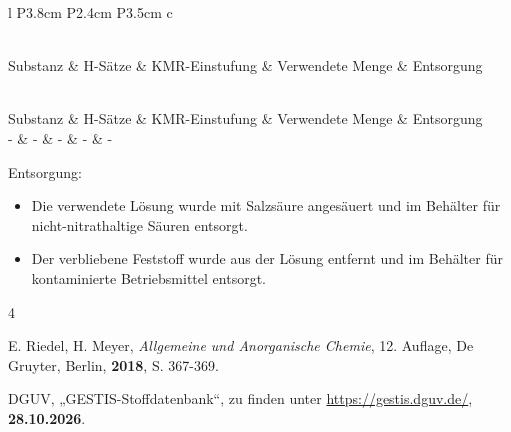 \documentclass[
	a4paper,										%
	12pt,											%
	twoside,										%
	headsepline,								%
	footsepline,									%
	captions=tableheading,					%
]{scrartcl}
\newcommand{\langetabelle}[6]{  %
	\begin{centering}           %
		{\begin{longtable}[#3]{#4}
				\caption{#2\label{tab: #1}}\\				
				\hline
				#5
				\hline
				\endfirsthead
                \caption{#2\label{tab: #1}}\\
				\hline
				#5
				\hline
				\endhead
				#6												
				\hline 
		\end{longtable}}
\end{centering}}
\begin{document}
\langetabelle
	{KMR_leer3}
	{Verwendete kanzerogene, mutagene oder reproduktionstoxische Gefahrstoffe (KMR).}
	{H}
	{l P{3.8cm} P{2.4cm} P{3.5cm} c}
	{Substanz & H-Sätze & KMR-Einstufung & Verwendete Menge & Entsorgung \\}
	{ - & - & - & - & - \\}
	
Entsorgung: \\
\begin{itemize}
    \item[(1)] Die verwendete Lösung wurde mit Salzsäure angesäuert und im Behälter für nicht-nitrathaltige Säuren entsorgt.
    \item[(2)] Der verbliebene Feststoff wurde aus der Lösung entfernt und im Behälter für kontaminierte Betriebsmittel entsorgt. 
\end{itemize}	


\begin{thebibliography}{4}		%

						{E. Riedel, H. Meyer}, 
			\textit	{Allgemeine und Anorganische Chemie}, 
						{12. Auflage}, 
						{De Gruyter}, 
						{Berlin}, 
			\textbf	{2018}, 
			S.			{367-369}.

						{DGUV}, 
						„{GESTIS-Stoffdatenbank}“, zu finden unter 
			\url		{https://gestis.dguv.de/}, 
			\textbf	{28.10.2026}.


\end{thebibliography}
\end{document}
